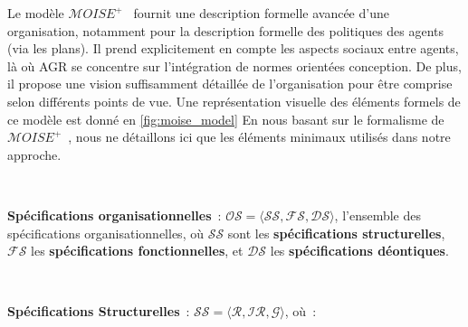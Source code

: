 \documentclass[francais,ROIA,Unicode,manuscript]{cedram}
\begin{document}
Le modèle $\mathcal{M}OISE^+$~\cite{Hubner2007} fournit une description formelle avancée d'une organisation, notamment pour la description formelle des politiques des agents (via les plans). Il prend explicitement en compte les aspects sociaux entre agents, là où AGR se concentre sur l'intégration de normes orientées conception. De plus, il propose une vision suffisamment détaillée de l'organisation pour être comprise selon différents points de vue. Une représentation visuelle des éléments formels de ce modèle est donné en \autoref{fig:moise_model}
En nous basant sur le formalisme de $\mathcal{M}OISE^+$~\cite{Hubner2007}, nous ne détaillons ici que les éléments minimaux utilisés dans notre approche.

\

\noindent \textbf{Spécifications organisationnelles}~: \quad $\mathcal{OS} = \langle \mathcal{SS}, \mathcal{FS}, \mathcal{DS} \rangle$, l'ensemble des spécifications organisationnelles, où $\mathcal{SS}$ sont les \textbf{spécifications structurelles}, $\mathcal{FS}$ les \textbf{spécifications fonctionnelles}, et $\mathcal{DS}$ les \textbf{spécifications déontiques}.

\

\noindent \textbf{Spécifications Structurelles}~: \quad $\mathcal{SS} = \langle \mathcal{R}, \mathcal{IR}, \mathcal{G} \rangle$, où~:
\end{document}
